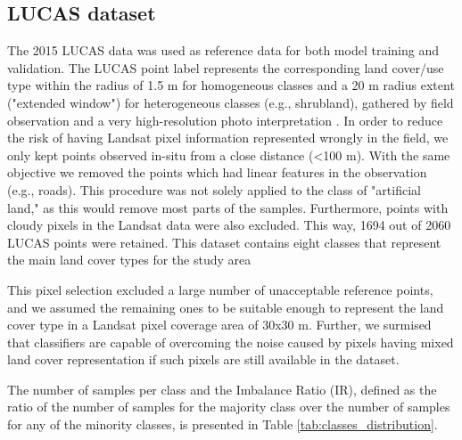 \documentclass[remotesensing,article,submit,moreauthors,pdftex]{Definitions/mdpi}
\begin{document}
\subsection{LUCAS dataset}

The 2015 LUCAS data was used as reference data for both model training and
validation. The LUCAS point label represents the corresponding land cover/use
type within the radius of 1.5 m for homogeneous classes and a 20 m radius
extent ("extended window") for heterogeneous classes (e.g., shrubland), gathered
by field observation and a very high-resolution photo interpretation
\cite{LUCAS2015C1}. In order to reduce the risk of having Landsat pixel
information represented wrongly in the field, we only kept points observed
in-situ from a close distance (<100 m). With the same objective we removed the
points which had linear features in the observation (e.g., roads).
This procedure was not solely applied to the class of "artificial land," as
this would remove most parts of the samples. Furthermore, points with cloudy
pixels in the Landsat data were also excluded. This way, 1694 out of 2060
LUCAS points were retained. This dataset contains eight classes that
represent the main land cover types for the study area

This pixel selection excluded a large number of unacceptable reference points,
and we assumed the remaining ones to be suitable enough to represent the land
cover type in a Landsat pixel coverage area of 30x30 m. Further, we surmised
that classifiers are capable of overcoming the noise caused by pixels having
mixed land cover representation if such pixels are still available in the
dataset.

The number of samples per class and the Imbalance Ratio (IR), defined as the
ratio of the number of samples for the majority class over the number of samples
for any of the minority classes, is presented in Table
\ref{tab:classes_distribution}.
\end{document}
